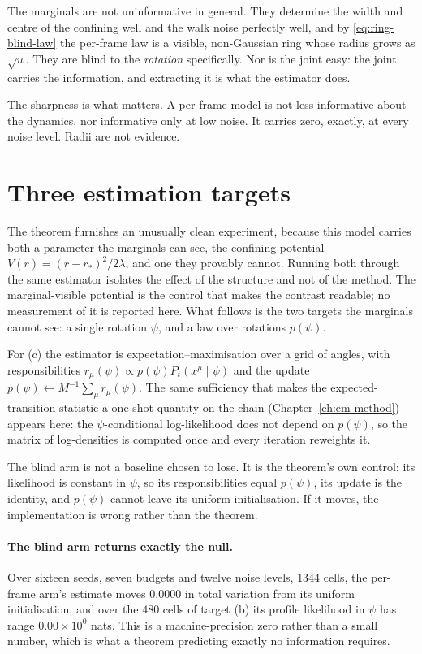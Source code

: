 \begin{remark}
The marginals are not uninformative in general. They determine the width and
centre of the confining well and the walk noise perfectly well, and by
\eqref{eq:ring-blind-law} the per-frame law is a visible, non-Gaussian ring
whose radius grows as $\sqrt{u}$. They are blind to the \emph{rotation}
specifically. Nor is the joint easy: the joint carries the information, and
extracting it is what the estimator does.

The sharpness is what matters. A per-frame model is not less informative about
the dynamics, nor informative only at low noise. It carries zero, exactly, at
every noise level. Radii are not evidence.
\end{remark}

\section{Three estimation targets}\label{sec:ring-estimation}

The theorem furnishes an unusually clean experiment, because this model carries
both a parameter the marginals can see, the confining potential
$V(r) = (r-r_*)^2/2\lambda$, and one they provably cannot. Running both through
the same estimator isolates the effect of the structure and not of the method.
The marginal-visible potential is the control that makes the contrast readable;
no measurement of it is reported here. What follows is the two targets the
marginals cannot see: a single rotation $\psi$, and a law over rotations
$p(\psi)$.

For (c) the estimator is expectation--maximisation over a grid of angles, with
responsibilities $r_\mu(\psi)\propto p(\psi)P_t(x^\mu\mid\psi)$ and the
update $p(\psi)\leftarrow M^{-1}\sum_\mu r_\mu(\psi)$. The same sufficiency
that makes the expected-transition statistic a one-shot quantity on the chain
(Chapter~\ref{ch:em-method}) appears here: the $\psi$-conditional
log-likelihood does not depend on $p(\psi)$, so the matrix of log-densities is
computed once and every iteration reweights it.

The blind arm is not a baseline chosen to lose. It is the theorem's own
control: its likelihood is constant in $\psi$, so its responsibilities equal
$p(\psi)$, its update is the identity, and $p(\psi)$ cannot leave its uniform
initialisation. If it moves, the implementation is wrong rather than the
theorem.

\paragraph{The blind arm returns exactly the null.} Over sixteen seeds, seven
budgets and twelve noise levels, $1344$ cells, the per-frame arm's
estimate moves $0.0000$ in total variation from its uniform initialisation,
and over the $480$ cells of target (b) its profile likelihood in $\psi$ has
range $0.00\times10^{0}$ nats. This is a machine-precision zero rather than a
small number, which is what a theorem predicting exactly no information
requires.


